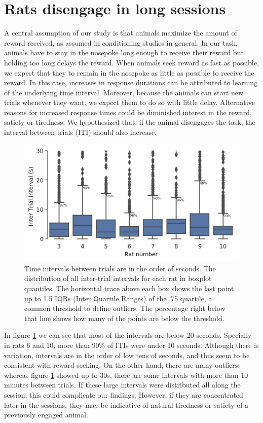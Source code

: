 \section{Rats disengage in long sessions}
    A central assumption of our study is that animals maximize the amount of reward received, as assumed in conditioning studies in general. In our task, animals have to stay in the nosepoke long enough to receive their reward but holding too long delays the reward. When animals seek reward as fast as possible, we expect that they to remain in the nosepoke as little as possible to receive the reward. In this case, increases in response durations can be attributed to learning of the underlying time interval. Moreover, because the animals can start new trials whenever they want, we expect them to do so with little delay. Alternative reasons for increased response times could be diminished interest in the reward, satiety or tiredness. We hypothesized that, if the animal disengages the task, the interval between trials (ITI) should also increase.

    \begin{figure}[h]
        \centering
        \includegraphics[width=\textwidth]{figures/inter_trial_boxplot.png}
        \caption[Time between trials is in the order of seconds]{Time intervals between trials are in the order of seconds. The distribution of all inter-trial intervals for each rat in boxplot quantiles. The horizontal trace above each box shows the last point up to 1.5 IQRs (Inter Quartile Ranges) of the .75 quartile, a common threshold to define outliers. The percentage right below that line shows how many of the points are below the threshold.}
        \label{fig:iti_box}
    \end{figure}
    
    In figure \ref{fig:iti_box} we can see that most of the intervals are below 20 seconds. Specially in rats 6 and 10, more than 90\% of ITIs were under 10 seconds. Although there is variation, intervals are in the order of low tens of seconds, and thus seem to be consistent with reward seeking. On the other hand, there are many outliers: whereas figure \ref{fig:iti_box} showed up to 30s, there are some intervals with more than 10 minutes between trials. If these large intervals were distributed all along the session, this could complicate our findings. However, if they are concentrated later in the sessions, they may be indicative of natural tiredness or satiety of a previously engaged animal.
    
